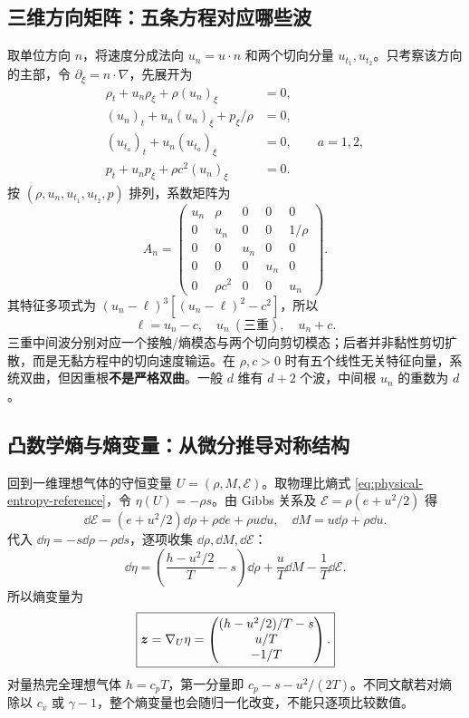 \subsection{三维方向矩阵：五条方程对应哪些波}

取单位方向 $n$，将速度分成法向 $u_n=u\cdot n$ 和两个切向分量 $u_{t_1},u_{t_2}$。只考察该方向的主部，令 $\partial_\xi=n\cdot\nabla$，先展开为
\begin{align}
 \rho_t+u_n\rho_\xi+\rho(u_n)_\xi&=0,\\
 (u_n)_t+u_n(u_n)_\xi+p_\xi/\rho&=0,\\
 (u_{t_a})_t+u_n(u_{t_a})_\xi&=0,\qquad a=1,2,\\
 p_t+u_np_\xi+\rho c^2(u_n)_\xi&=0.
\end{align}
按 $(\rho,u_n,u_{t_1},u_{t_2},p)$ 排列，系数矩阵为
\begin{equation}
 A_n=\begin{pmatrix}
 u_n&\rho&0&0&0\\
 0&u_n&0&0&1/\rho\\
 0&0&u_n&0&0\\
 0&0&0&u_n&0\\
 0&\rho c^2&0&0&u_n
 \end{pmatrix}.
\end{equation}
其特征多项式为 $(u_n-\ell)^3[(u_n-\ell)^2-c^2]$，所以
\begin{equation}
 \ell=u_n-c,\quad u_n\ (\text{三重}),\quad u_n+c.
\end{equation}
三重中间波分别对应一个接触/熵模态与两个切向剪切模态；后者并非黏性剪切扩散，而是无黏方程中的切向速度输运。在 $\rho,c>0$ 时有五个线性无关特征向量，系统双曲，但因重根\textbf{不是严格双曲}。一般 $d$ 维有 $d+2$ 个波，中间根 $u_n$ 的重数为 $d$。

\subsection{凸数学熵与熵变量：从微分推导对称结构}

回到一维理想气体的守恒变量 $U=(\rho,M,\mathcal E)$。取物理比熵式 \eqref{eq:physical-entropy-reference}，令 $\eta(U)=-\rho s$。由 Gibbs 关系及 $\mathcal E=\rho(e+u^2/2)$ 得
\begin{equation}
 \dd\mathcal E=(e+u^2/2)\dd\rho+\rho\dd e+\rho u\dd u,
 \quad\dd M=u\dd\rho+\rho\dd u.
\end{equation}
代入 $\dd\eta=-s\dd\rho-\rho\dd s$，逐项收集 $\dd\rho,\dd M,\dd\mathcal E$：
\begin{equation}
 \dd\eta=\left(\frac{h-u^2/2}{T}-s\right)\dd\rho
 +\frac uT\dd M-\frac1T\dd\mathcal E.
\end{equation}
所以熵变量为
\begin{equation}
 \boxed{\bm{z}=\nabla_U\eta
 =\begin{pmatrix}(h-u^2/2)/T-s\\u/T\\-1/T\end{pmatrix}.}
 \label{eq:physical-entropy-variables}
\end{equation}
对量热完全理想气体 $h=c_pT$，第一分量即 $c_p-s-u^2/(2T)$。不同文献若对熵除以 $c_v$ 或 $\gamma-1$，整个熵变量也会随归一化改变，不能只逐项比较数值。

